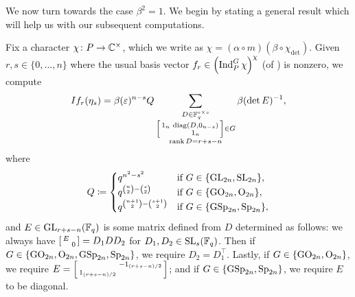 We now turn towards the case $\beta^2=1$. We begin by stating a general result which will help us with our subsequent computations.
\begin{lemma} \label{lem:matrix-coeff}
	Fix a character $\chi\colon P\to\mathbb C^\times$, which we write as $\chi=(\alpha\circ m)(\beta\circ\chi_{\det})$. Given $r,s\in\{0,\ldots,n\}$ where the usual basis vector $f_r\in\left(\operatorname{Ind}_P^G\chi\right)^\chi$ (of ) is nonzero, we compute
	\[If_r(\eta_s)=\beta(\varepsilon)^{n-s}Q\sum_{\substack{D\in\mathbb F_q^{s\times s}\\\begin{bsmallmatrix}
		1_n & \operatorname{diag}(D,0_{n-s}) \\ & 1_n
	\end{bsmallmatrix}\in G\\\operatorname{rank}D=r+s-n}}\beta(\det E)^{-1},\]
	where
	\[Q\coloneqq\begin{cases}
		q^{n^2-s^2} & \text{if }G\in\{\mathrm{GL}_{2n},\mathrm{SL}_{2n}\}, \\
		q^{\binom{n}2-\binom{s}2} & \text{if }G\in\{\mathrm{GO}_{2n},\mathrm{O}_{2n}\}, \\
		q^{\binom{n+1}2-\binom{s+1}2} & \text{if }G\in\{\mathrm{GSp}_{2n},\mathrm{Sp}_{2n}\},
	\end{cases}\]
	and $E\in\mathrm{GL}_{r+s-n}(\mathbb F_q)$ is some matrix defined from $D$ determined as follows: we always have $\begin{bsmallmatrix}
		E \\ & 0
	\end{bsmallmatrix}=D_1DD_2$ for $D_1,D_2\in\mathrm{SL}_s(\mathbb F_q)$. Then if $G\in\{\mathrm{GO}_{2n},\mathrm{O}_{2n},\mathrm{GSp}_{2n},\mathrm{Sp}_{2n}\}$, we require $D_2=D_1^\intercal$. Lastly, if $G\in\{\mathrm{GO}_{2n},\mathrm{O}_{2n}\}$, we require $E=\begin{bsmallmatrix}
		& -1_{(r+s-n)/2} \\ 1_{(r+s-n)/2}
	\end{bsmallmatrix}$; and if $G\in\{\mathrm{GSp}_{2n},\mathrm{Sp}_{2n}\}$, we require $E$ to be diagonal.
\end{lemma}
